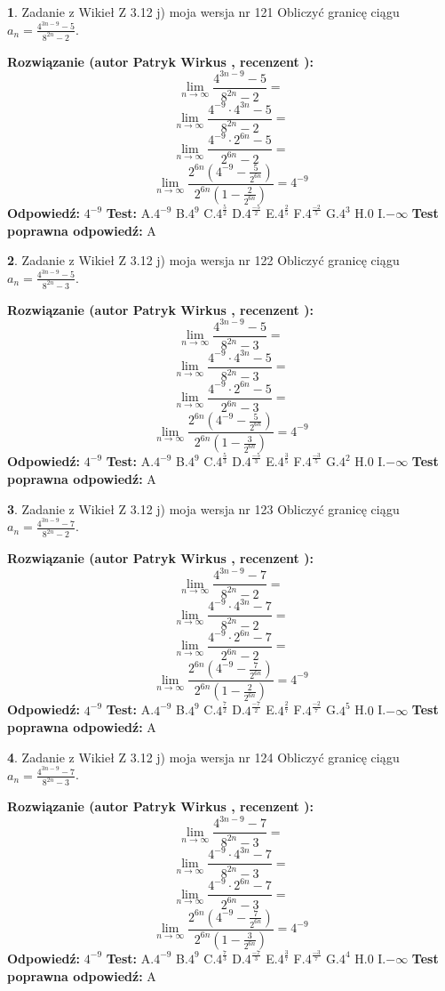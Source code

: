 \documentclass[12pt, a4paper]{article}
\theoremstyle{definition} %
\newtheorem{zad}{}
\newcommand{\zadStart}[1]{\begin{zad}#1\newline}
\newcommand{\zadStop}{\end{zad}}
\newcommand{\rozwStart}[2]{\noindent \textbf{Rozwiązanie (autor #1 , recenzent #2): }\newline}
\newcommand{\rozwStop}{\newline}
\newcommand{\odpStart}{\noindent \textbf{Odpowiedź:}\newline}
\newcommand{\odpStop}{\newline}
\newcommand{\testStart}{\noindent \textbf{Test:}\newline}
\newcommand{\testStop}{\newline}
\newcommand{\kluczStart}{\noindent \textbf{Test poprawna odpowiedź:}\newline}
\newcommand{\kluczStop}{\newline}
\begin{document}
\zadStart{Zadanie z Wikieł Z 3.12 j) moja wersja nr 121}
Obliczyć granicę ciągu $a_{n}=\frac{4^{3n-9}-5}{8^{2n}-2}$.
\zadStop
\rozwStart{Patryk Wirkus}{}
$$\lim\limits_{n\to\infty}\frac{4^{3n-9}-5}{8^{2n}-2}=$$
$$\lim\limits_{n\to\infty}\frac{4^{-9} \cdot 4^{3n}-5}{8^{2n}-2}=$$
$$\lim\limits_{n\to\infty}\frac{4^{-9} \cdot 2^{6n}-5}{2^{6n}-2}=$$
$$\lim\limits_{n\to\infty}\frac{2^{6n}(4^{-9} - \frac{5}{2^{6n}})}{2^{6n}(1-\frac{2}{2^{6n}})}= 4^{-9}$$
\rozwStop
\odpStart
$4^{-9}$
\odpStop
\testStart
A.$4^{-9}$
B.$4^{9}$
C.$4^{\frac{5}{2}}$
D.$4^{\frac{-5}{2}}$
E.$4^{\frac{2}{5}}$
F.$4^{\frac{-2}{5}}$
G.$4^{3}$
H.$0$
I.$-\infty$
\testStop
\kluczStart
A
\kluczStop



\zadStart{Zadanie z Wikieł Z 3.12 j) moja wersja nr 122}
Obliczyć granicę ciągu $a_{n}=\frac{4^{3n-9}-5}{8^{2n}-3}$.
\zadStop
\rozwStart{Patryk Wirkus}{}
$$\lim\limits_{n\to\infty}\frac{4^{3n-9}-5}{8^{2n}-3}=$$
$$\lim\limits_{n\to\infty}\frac{4^{-9} \cdot 4^{3n}-5}{8^{2n}-3}=$$
$$\lim\limits_{n\to\infty}\frac{4^{-9} \cdot 2^{6n}-5}{2^{6n}-3}=$$
$$\lim\limits_{n\to\infty}\frac{2^{6n}(4^{-9} - \frac{5}{2^{6n}})}{2^{6n}(1-\frac{3}{2^{6n}})}= 4^{-9}$$
\rozwStop
\odpStart
$4^{-9}$
\odpStop
\testStart
A.$4^{-9}$
B.$4^{9}$
C.$4^{\frac{5}{3}}$
D.$4^{\frac{-5}{3}}$
E.$4^{\frac{3}{5}}$
F.$4^{\frac{-3}{5}}$
G.$4^{2}$
H.$0$
I.$-\infty$
\testStop
\kluczStart
A
\kluczStop



\zadStart{Zadanie z Wikieł Z 3.12 j) moja wersja nr 123}
Obliczyć granicę ciągu $a_{n}=\frac{4^{3n-9}-7}{8^{2n}-2}$.
\zadStop
\rozwStart{Patryk Wirkus}{}
$$\lim\limits_{n\to\infty}\frac{4^{3n-9}-7}{8^{2n}-2}=$$
$$\lim\limits_{n\to\infty}\frac{4^{-9} \cdot 4^{3n}-7}{8^{2n}-2}=$$
$$\lim\limits_{n\to\infty}\frac{4^{-9} \cdot 2^{6n}-7}{2^{6n}-2}=$$
$$\lim\limits_{n\to\infty}\frac{2^{6n}(4^{-9} - \frac{7}{2^{6n}})}{2^{6n}(1-\frac{2}{2^{6n}})}= 4^{-9}$$
\rozwStop
\odpStart
$4^{-9}$
\odpStop
\testStart
A.$4^{-9}$
B.$4^{9}$
C.$4^{\frac{7}{2}}$
D.$4^{\frac{-7}{2}}$
E.$4^{\frac{2}{7}}$
F.$4^{\frac{-2}{7}}$
G.$4^{5}$
H.$0$
I.$-\infty$
\testStop
\kluczStart
A
\kluczStop



\zadStart{Zadanie z Wikieł Z 3.12 j) moja wersja nr 124}
Obliczyć granicę ciągu $a_{n}=\frac{4^{3n-9}-7}{8^{2n}-3}$.
\zadStop
\rozwStart{Patryk Wirkus}{}
$$\lim\limits_{n\to\infty}\frac{4^{3n-9}-7}{8^{2n}-3}=$$
$$\lim\limits_{n\to\infty}\frac{4^{-9} \cdot 4^{3n}-7}{8^{2n}-3}=$$
$$\lim\limits_{n\to\infty}\frac{4^{-9} \cdot 2^{6n}-7}{2^{6n}-3}=$$
$$\lim\limits_{n\to\infty}\frac{2^{6n}(4^{-9} - \frac{7}{2^{6n}})}{2^{6n}(1-\frac{3}{2^{6n}})}= 4^{-9}$$
\rozwStop
\odpStart
$4^{-9}$
\odpStop
\testStart
A.$4^{-9}$
B.$4^{9}$
C.$4^{\frac{7}{3}}$
D.$4^{\frac{-7}{3}}$
E.$4^{\frac{3}{7}}$
F.$4^{\frac{-3}{7}}$
G.$4^{4}$
H.$0$
I.$-\infty$
\testStop
\kluczStart
A
\kluczStop
\end{document}
